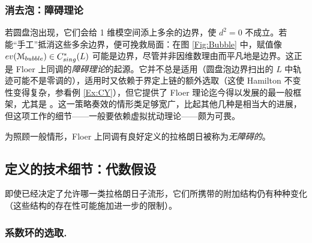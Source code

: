 \documentclass[11pt,a4paper]{article}
\numberwithin{equation}{section}
\newcommand{\scrM}{\EuScript{M}}
\begin{document}
\subsubsection{消去泡：障碍理论} 若圆盘泡出现，它们会给 1 维模空间添上多余的边界，使 $d^2=0$ 不成立。若能“手工”抵消这些多余边界，便可挽救局面：在图 \ref{Fig:Bubble} 中，赋值像 $ev(\scrM_{bubble}) \in C^*_{sing}(L)$ 可能是边界，尽管并非因维数理由而平凡地是边界。这正是 Floer 上同调的\emph{障碍理论}的起源。它并不总是适用（圆盘泡边界扫出的 $L$ 中轨迹可能不是零调的），适用时又依赖于界定上链的额外选取（这使 Hamilton 不变性变得复杂，参看例 \ref{Ex:CY}），但它提供了 Floer 理论迄今得以发展的最一般框架，尤其是 \cite{FO3, FO3:technical}。这一策略奏效的情形类足够宽广，比起其他几种是相当大的进展，但这项工作的细节——一般要依赖虚拟扰动理论——颇为可畏。

为照顾一般情形，Floer 上同调有良好定义的拉格朗日被称为\emph{无障碍的}。

\subsection{定义的技术细节：代数假设\label{Sec:AlgebraicHyp}} 即使已经决定了允许哪一类拉格朗日子流形，它们所携带的附加结构仍有种种变化（这些结构的存在性可能施加进一步的限制）。

\subsubsection{系数环的选取.\label{Sec:Novikov}}
\end{document}
